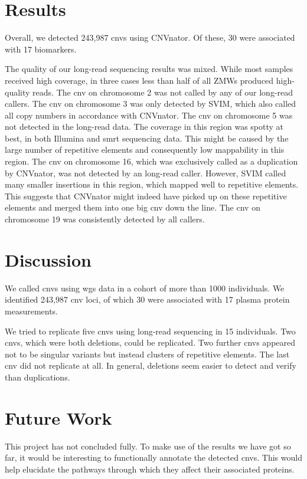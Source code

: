 \documentclass[draft]{scrbook}
\begin{document}
\section{Results}
Overall, we detected 243,987 \glspl{cnv} using \textsf{CNVnator}.
Of these, 30 were associated with 17 biomarkers.

The quality of our long-read sequencing results was mixed.
While most samples received high coverage, in three cases less than half of all ZMWs produced high-quality reads.
The \gls{cnv} on chromosome 2 was not called by any of our long-read callers.
The \gls{cnv} on chromosome 3 was only detected by \textsf{SVIM}, which also called all copy numbers in accordance with \textsf{CNVnator}.
The \gls{cnv} on chromosome 5 was not detected in the long-read data.
The coverage in this region was spotty at best, in both Illumina and \gls{smrt} sequencing data.
This might be caused by the large number of repetitive elements and consequently low mappability in this region.
The \gls{cnv} on chromosome 16, which was exclusively called as a duplication by \textsf{CNVnator}, was not detected by an long-read caller.
However, \textsf{SVIM} called many smaller insertions in this region, which mapped well to repetitive elements.
This suggests that \textsf{CNVnator} might indeed have picked up on these repetitive elements and merged them into one big \gls{cnv} down the line.
The \gls{cnv} on chromosome 19 was consistently detected by all callers.

\section{Discussion}
We called \glspl{cnv} using \gls{wgs} data in a cohort of more than 1000 individuals.
We identified 243,987 \gls{cnv} loci, of which 30 were associated with 17 plasma protein measurements.

We tried to replicate five \glspl{cnv} using long-read sequencing in 15 individuals.
Two \glspl{cnv}, which were both deletions, could be replicated.
Two further \glspl{cnv} appeared not to be singular variants but instead clusters of repetitive elements.
The last \gls{cnv} did not replicate at all.
In general, deletions seem easier to detect and verify than duplications.

\section{Future Work}
This project has not concluded fully.
To make use of the results we have got so far, it would be interesting to functionally annotate the detected \glspl{cnv}.
This would help elucidate the pathways through which they affect their associated proteins.
\end{document}
